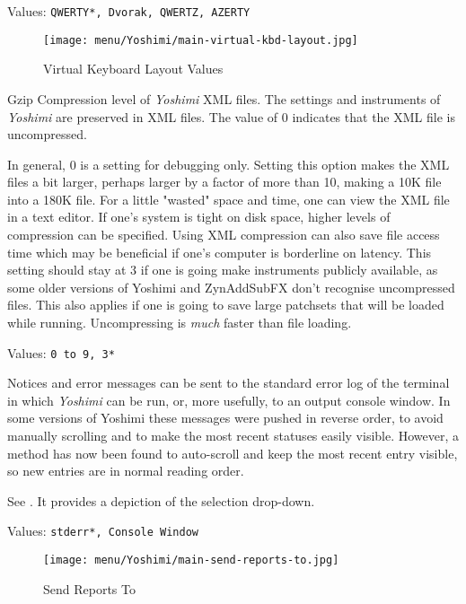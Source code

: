    Values: \texttt{QWERTY*, Dvorak, QWERTZ, AZERTY}

\begin{figure}[H]
   \centering
   \texttt{[image: menu/Yoshimi/main-virtual-kbd-layout.jpg]}
   \caption[Virtual Keyboard Layout]{Virtual Keyboard Layout Values}
   \label{fig:virtual_kbd_layout}
\end{figure}

   Gzip Compression level of \textsl{Yoshimi} XML files.
   The settings and instruments of
   \textsl{Yoshimi}
   are preserved in XML files.
   The value of 0 indicates that the XML file is uncompressed.

   In general, 0 is a setting for debugging only.  Setting this
   option makes the XML files a bit larger, perhaps larger by a factor of more
   than 10, making a 10K file into a 180K file.  For a little "wasted" space
   and time, one can view the XML file in a text editor.  If
   one's system is tight on disk space, higher levels of compression can be
   specified.  Using XML compression can also save file access time which may
   be beneficial if one's computer is borderline on latency.  This setting
   should stay at 3 if one is going make instruments publicly available, as
   some older versions of Yoshimi and ZynAddSubFX don't recognise uncompressed
   files. This also applies if one is going to save large patchsets that will
   be loaded while running. Uncompressing is \textsl{much} faster than file
   loading.

   Values: \texttt{0 to 9, 3*}

   Notices and error messages can be sent to the standard error log of
   the terminal in which
   \textsl{Yoshimi} can be run, or, more usefully, to
   an output console window.
   In some versions of Yoshimi these messages were pushed in reverse order, to
   avoid manually scrolling and to make the most recent statuses easily visible.
   However, a method has now been found to auto-scroll and keep the most recent
   entry visible, so new entries are in normal reading order.

   See .
   It provides a depiction of the selection drop-down.

   Values: \texttt{stderr*, Console Window}

\begin{figure}[H]
   \centering
   \texttt{[image: menu/Yoshimi/main-send-reports-to.jpg]}
   \caption[Send Reports]{Send Reports To}
   \label{fig:send_reports_to}
\end{figure}

